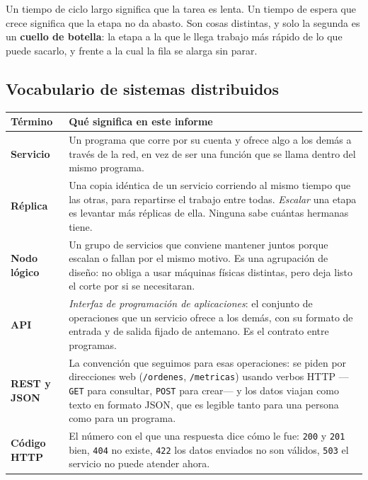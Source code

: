 \documentclass[12pt,a4paper]{article}
\begin{document}
Un tiempo de ciclo largo significa que la tarea es lenta. Un tiempo de espera
que crece significa que la etapa no da abasto. Son cosas distintas, y
solo la segunda es un \textbf{cuello de botella}: la etapa a la que le llega
trabajo más rápido de lo que puede sacarlo, y frente a la cual la fila se
alarga sin parar.

\subsection{Vocabulario de sistemas distribuidos}

\begin{table}[H]
\centering
\footnotesize
\begin{tabular}{@{}L{3.05cm} L{12.15cm}@{}}
\toprule
\textbf{Término} & \textbf{Qué significa en este informe} \\
\midrule
\textbf{Servicio} &
Un programa que corre por su cuenta y ofrece algo a los demás a través de la
red, en vez de ser una función que se llama dentro del mismo programa. \\
\addlinespace[2pt]
\textbf{Réplica} &
Una copia idéntica de un servicio corriendo al mismo tiempo que las otras, para
repartirse el trabajo entre todas. \emph{Escalar} una etapa es levantar más
réplicas de ella. Ninguna sabe cuántas hermanas tiene. \\
\addlinespace[2pt]
\textbf{Nodo lógico} &
Un grupo de servicios que conviene mantener juntos porque escalan o fallan por
el mismo motivo. Es una agrupación de diseño: no obliga a usar máquinas
físicas distintas, pero deja listo el corte por si se necesitaran. \\
\addlinespace[2pt]
\textbf{API} &
\emph{Interfaz de programación de aplicaciones}: el conjunto de operaciones
que un servicio ofrece a los demás, con su formato de entrada y de salida
fijado de antemano. Es el contrato entre programas. \\
\addlinespace[2pt]
\textbf{REST y JSON} &
La convención que seguimos para esas operaciones: se piden por direcciones web
(\texttt{/ordenes}, \texttt{/metricas}) usando verbos HTTP —\texttt{GET} para
consultar, \texttt{POST} para crear— y los datos viajan como texto en formato
JSON, que es legible tanto para una persona como para un programa. \\
\addlinespace[2pt]
\textbf{Código HTTP} &
El número con el que una respuesta dice cómo le fue: \texttt{200} y
\texttt{201} bien, \texttt{404} no existe, \texttt{422} los datos enviados no
son válidos, \texttt{503} el servicio no puede atender ahora. \\

\end{tabular}
\end{table}
\end{document}
